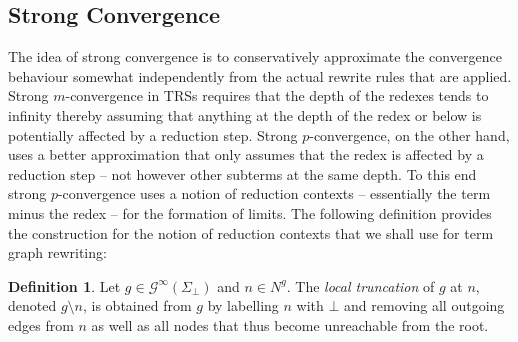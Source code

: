 \documentclass[copyright,creativecommons,UKenglish,final]{eptcs}
\newcommand\truncl[2]{#1{\setminus}#2}
\newcommand\calG{\mathcal{G}}
\newcommand\prs{p}
\newcommand\mrs{m}
\newcommand\iptgraphs[1][\Sigma]{\calG^\infty(#1_\bot)}
\theoremstyle{definition}
\newtheorem{definition}{Definition}[section]
\theoremstyle{plain}
\begin{document}
\subsection{Strong Convergence}
\label{sec:strong-convergence}

The idea of strong convergence is to conservatively approximate the
convergence behaviour somewhat independently from the actual rewrite
rules that are applied. Strong $\mrs$-convergence in TRSs requires
that the depth of the redexes tends to infinity thereby assuming that
anything at the depth of the redex or below is potentially affected by
a reduction step. Strong $\prs$-convergence, on the other hand, uses a
better approximation that only assumes that the redex is affected by a
reduction step -- not however other subterms at the same depth. To
this end strong $\prs$-convergence uses a notion of reduction contexts
-- essentially the term minus the redex -- for the formation of
limits. The following definition provides the construction for the
notion of reduction contexts that we shall use for term graph
rewriting:
\begin{definition}\label{def:truncl}
  Let $g \in \iptgraphs$ and $n \in N^g$. The \emph{local truncation}
  of $g$ at $n$, denoted $\truncl{g}{n}$, is obtained from $g$ by
  labelling $n$ with $\bot$ and removing all outgoing edges from $n$
  as well as all nodes that thus become unreachable from the
  root.
\end{definition}
\end{document}
